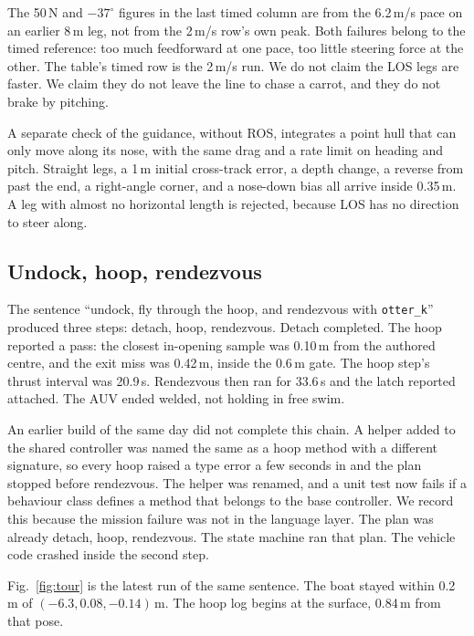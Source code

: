 \documentclass[conference]{IEEEtran}
\def\otterk{\texttt{otter\_k}}
\begin{document}
The 50\,N and $-37^\circ$ figures in the last timed column are from the 6.2\,m/s pace on an earlier 8\,m leg, not from the 2\,m/s row's own peak. Both failures belong to the timed reference: too much feedforward at one pace, too little steering force at the other. The table's timed row is the 2\,m/s run. We do not claim the LOS legs are faster. We claim they do not leave the line to chase a carrot, and they do not brake by pitching.

A separate check of the guidance, without ROS, integrates a point hull that can only move along its nose, with the same drag and a rate limit on heading and pitch. Straight legs, a 1\,m initial cross-track error, a depth change, a reverse from past the end, a right-angle corner, and a nose-down bias all arrive inside 0.35\,m. A leg with almost no horizontal length is rejected, because LOS has no direction to steer along.

\subsection{Undock, hoop, rendezvous}
The sentence ``undock, fly through the hoop, and rendezvous with \otterk{}'' produced three steps: detach, hoop, rendezvous. Detach completed. The hoop reported a pass: the closest in-opening sample was 0.10\,m from the authored centre, and the exit miss was 0.42\,m, inside the 0.6\,m gate. The hoop step's thrust interval was 20.9\,s. Rendezvous then ran for 33.6\,s and the latch reported attached. The AUV ended welded, not holding in free swim.

An earlier build of the same day did not complete this chain. A helper added to the shared controller was named the same as a hoop method with a different signature, so every hoop raised a type error a few seconds in and the plan stopped before rendezvous. The helper was renamed, and a unit test now fails if a behaviour class defines a method that belongs to the base controller. We record this because the mission failure was not in the language layer. The plan was already detach, hoop, rendezvous. The state machine ran that plan. The vehicle code crashed inside the second step.

Fig.~\ref{fig:tour} is the latest run of the same sentence. The boat stayed within 0.2\,m of $(-6.3, 0.08, -0.14)$\,m. The hoop log begins at the surface, 0.84\,m from that pose.
\end{document}
